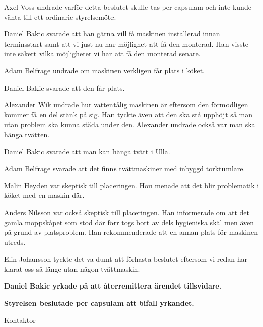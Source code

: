\documentclass[10pt]{article}
\begin{document}
        Axel Voss undrade varför detta beslutet skulle tas per capsulam och inte kunde vänta till ett ordinarie styrelsemöte.

        Daniel Bakic svarade att han gärna vill få maskinen installerad innan terminsstart samt att vi just nu har möjlighet att få den monterad. Han visste inte säkert vilka möjligheter vi har att få den monterad senare.

        Adam Belfrage undrade om maskinen verkligen får plats i köket.

        Daniel Bakic svarade att den får plats. 

        Alexander Wik undrade hur vattentålig maskinen är eftersom den förmodligen kommer få en del stänk på sig. Han tyckte även att den ska stå upphöjt så man utan problem ska kunna städa under den.
        Alexander undrade också var man ska hänga tvätten.

        Daniel Bakic svarade att man kan hänga tvätt i Ulla.

        Adam Belfrage svarade att det finns tvättmaskiner med inbyggd torktumlare.
        
        Malin Heyden var skeptisk till placeringen. Hon menade att det blir problematik i köket med en maskin där.

        Anders Nilsson var också skeptisk till placeringen. Han informerade om att det gamla moppskåpet som stod där förr togs bort av dels hygieniska skäl men även på grund av platsproblem. Han rekommenderade att en annan plats för maskinen utreds.

        Elin Johansson tyckte det va dumt att förhasta beslutet eftersom vi redan har klarat oss så länge utan någon tvättmaskin. 

        \textbf{Daniel Bakic yrkade på att återremittera ärendet tillsvidare.}

        \textbf{Styrelsen beslutade per capsulam att bifall yrkandet.}

        \begin{signatures}{1}
        \signature{Axel Voss}{Kontaktor}
        \end{signatures}
    
\end{document}
